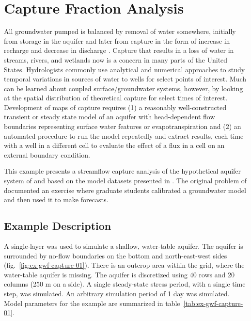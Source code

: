 \section{Capture Fraction Analysis}

All groundwater pumped is balanced by removal of water somewhere, initially from storage in the aquifer and later from capture in the form of increase in recharge and decrease in discharge \citep{leake2010new}. Capture that results in a loss of water in streams, rivers, and wetlands now is a concern in many parts of the United States. Hydrologists commonly use analytical and numerical approaches to study temporal variations in sources of water to wells for select points of interest. Much can be learned about coupled surface/groundwater systems, however, by looking at the spatial distribution of theoretical capture for select times of interest. Development of maps of capture requires (1) a reasonably well-constructed transient or steady state model of an aquifer with head-dependent flow boundaries representing surface water features or evapotranspiration and (2) an automated procedure to run the model repeatedly and extract results, each time with a well in a different cell to evaluate the effect of a flux in a cell on an external boundary condition.

This example presents a streamflow capture analysis of the hypothetical aquifer system of \cite{freyberg1988exercise} and based on the model datasets presented in \cite{hunt2020revisiting}. The original problem of \cite{freyberg1988exercise} documented an exercise where graduate students calibrated a groundwater model and then used it to make forecasts.


\subsection{Example Description}

A single-layer was used to simulate a shallow, water-table aquifer. The aquifer is surrounded by no-flow boundaries on the bottom and north-east-west sides (fig.~\ref{fig:ex-gwf-capture-01}). There is an outcrop area within the grid, where the water-table aquifer is missing. The aquifer is discretized using 40 rows and 20 columns (250 m on a side). A single steady-state stress period, with a single time step, was simulated. An arbitrary simulation period of 1 day was simulated. Model parameters for the example are summarized in table~\ref{tab:ex-gwf-capture-01}. 

